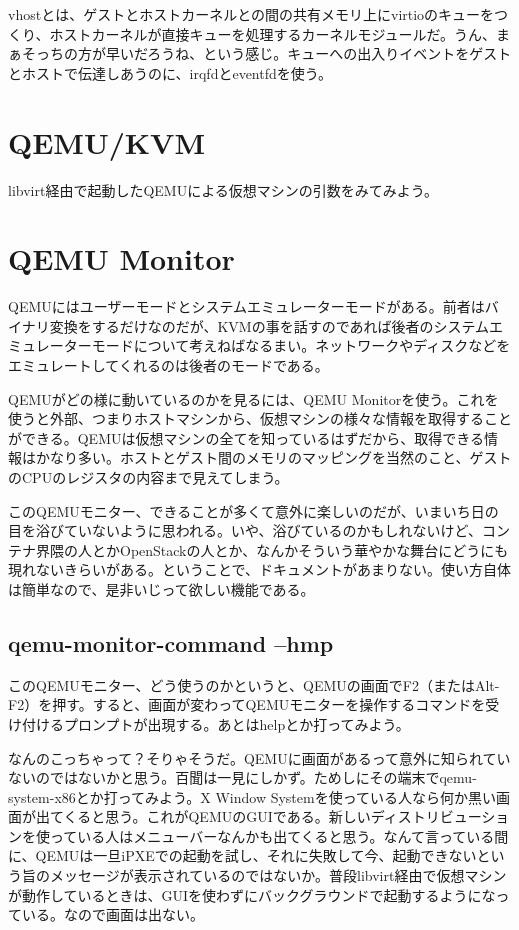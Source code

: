 \documentclass[9pt,b5paper,tombo]{jsbook}
\begin{document}
vhostとは、ゲストとホストカーネルとの間の共有メモリ上にvirtioのキューをつくり、ホストカーネルが直接キューを処理するカーネルモジュールだ。うん、まぁそっちの方が早いだろうね、という感じ。キューへの出入りイベントをゲストとホストで伝達しあうのに、irqfdとeventfdを使う。

\section{QEMU/KVM}

libvirt経由で起動したQEMUによる仮想マシンの引数をみてみよう。

\section{QEMU Monitor}

QEMUにはユーザーモードとシステムエミュレーターモードがある。前者はバイナリ変換をするだけなのだが、KVMの事を話すのであれば後者のシステムエミュレーターモードについて考えねばなるまい。ネットワークやディスクなどをエミュレートしてくれるのは後者のモードである。

QEMUがどの様に動いているのかを見るには、QEMU Monitorを使う。これを使うと外部、つまりホストマシンから、仮想マシンの様々な情報を取得することができる。QEMUは仮想マシンの全てを知っているはずだから、取得できる情報はかなり多い。ホストとゲスト間のメモリのマッピングを当然のこと、ゲストのCPUのレジスタの内容まで見えてしまう。

このQEMUモニター、できることが多くて意外に楽しいのだが、いまいち日の目を浴びていないように思われる。いや、浴びているのかもしれないけど、コンテナ界隈の人とかOpenStackの人とか、なんかそういう華やかな舞台にどうにも現れないきらいがある。ということで、ドキュメントがあまりない。使い方自体は簡単なので、是非いじって欲しい機能である。

\subsection{qemu-monitor-command --hmp}

このQEMUモニター、どう使うのかというと、QEMUの画面でF2（またはAlt-F2）を押す。すると、画面が変わってQEMUモニターを操作するコマンドを受け付けるプロンプトが出現する。あとはhelpとか打ってみよう。

なんのこっちゃって？そりゃそうだ。QEMUに画面があるって意外に知られていないのではないかと思う。百聞は一見にしかず。ためしにその端末でqemu-system-x86とか打ってみよう。X Window Systemを使っている人なら何か黒い画面が出てくると思う。これがQEMUのGUIである。新しいディストリビューションを使っている人はメニューバーなんかも出てくると思う。なんて言っている間に、QEMUは一旦iPXEでの起動を試し、それに失敗して今、起動できないという旨のメッセージが表示されているのではないか。普段libvirt経由で仮想マシンが動作しているときは、GUIを使わずにバックグラウンドで起動するようになっている。なので画面は出ない。
\end{document}
